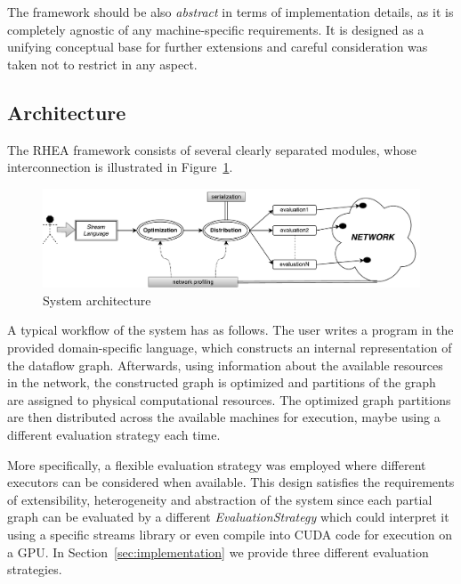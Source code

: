 \documentclass[sigplan,screen]{acmart}
\begin{document}
The framework should be also \textit{abstract} in terms of implementation details,
as it is completely agnostic of any machine-specific requirements. It is designed as a
unifying conceptual base for further extensions and careful consideration was
taken not to restrict in any aspect.

\subsection{Architecture}
The \textsc{RHEA} framework consists of several clearly separated modules,
whose interconnection is illustrated in Figure~\ref{fig:architecture}.
%
\begin{figure}
  \centering
  \includegraphics[scale=0.6]{architecture}
    \caption{System architecture}
    \label{fig:architecture}
\end{figure}

A typical workflow of the system has as follows. The user writes a program in
the provided domain-specific language, which constructs an internal representation
of the dataflow graph. Afterwards, using information about the available
resources in the network, the constructed graph is optimized and partitions of the
graph are assigned to physical computational resources. The optimized graph partitions are
then distributed across the available machines for execution, maybe using a
different evaluation strategy each time.

More specifically, a flexible evaluation strategy was employed where different
executors can be considered when available. This design satisfies the requirements
of extensibility, heterogeneity and abstraction of the system since each partial
graph can be evaluated by a different \textit{EvaluationStrategy} which could
interpret it using a specific streams library or even compile into CUDA code
for execution on a GPU. In Section~\ref{sec:implementation} we provide three
different evaluation strategies.
\end{document}
